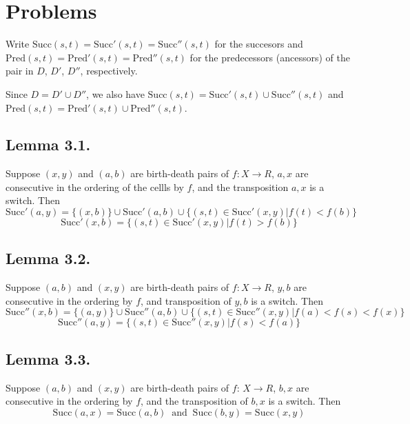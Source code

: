 \documentclass{article}
\begin{document}
\section{Problems}
\par Write $\text{Succ}(s, t) = \text{Succ}'(s, t) = \text{Succ}''(s, t)$ for the succesors and $\text{Pred}(s, t) = \text{Pred}'(s, t) = \text{Pred}''(s, t)$ for the predecessors (ancessors) of the pair in $D$, $D'$, $D''$, respectively.

\par Since $D = D' \cup D''$, we also have $\text{Succ}(s, t) = \text{Succ}'(s, t) \cup \text{Succ}''(s, t)$ and $\text{Pred}(s, t) = \text{Pred}'(s, t) \cup \text{Pred}''(s, t)$.

\subsection{Lemma 3.1.}
\par Suppose $(x, y)$ and $(a, b)$ are birth-death pairs of $f: X\to R$, $a, x$ are consecutive in the ordering of the cellls by $f$, and the transposition $a, x$ is a switch. Then
$$
\text{Succ}'(a, y) = \{(x, b)\} \cup \text{Succ}'(a, b) \cup \{(s, t)\in \text{Succ}'(x, y) | f(t)<f(b)\}
$$
$$
\text{Succ}'(x, b) = \{(s, t)\in \text{Succ}'(x, y) | f(t) > f(b)\}
$$

\subsection{Lemma 3.2.}
\par Suppose $(a, b)$ and $(x, y)$ are birth-death pairs of $f:X\to R$, $y, b$ are consecutive in the ordering by $f$, and transposition of $y, b$ is a switch. Then
$$
\text{Succ}''(x, b) = \{(a, y)\} \cup \text{Succ}''(a, b) \cup \{(s, t)\in \text{Succ}''(x, y) | f(a) < f(s) < f(x)\}
$$
$$
\text{Succ}''(a, y) = \{(s, t)\in\text{Succ}''(x, y) | f(s) < f(a)\}
$$

\subsection{Lemma 3.3.}
\par Suppose $(a, b)$ and $(x, y)$ are birth-death pairs of $f$: $X\to R$, $b, x$ are consecutive in the ordering by $f$, and the transposition of $b, x$ is a switch. Then
$$
\text{Succ}(a, x) = \text{Succ}(a, b)
\;\;\text{and}\;\; 
\text{Succ}(b, y) = \text{Succ}(x, y)
$$
\end{document}
